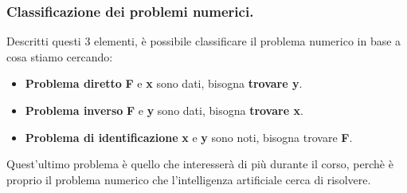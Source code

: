 \subsubsection{Classificazione dei problemi numerici.} Descritti questi 
%
3 elementi, è possibile classificare il problema numerico in base a 
%
cosa stiamo cercando:
\begin{itemize}
    \item \textbf{Problema diretto} \textbf{F} e \textbf{x} sono dati,
%
    bisogna \textbf{trovare y}.
    \item \textbf{Problema inverso} \textbf{F} e \textbf{y} sono dati,
%
    bisogna \textbf{trovare x}.
    \item \textbf{Problema di identificazione} \textbf{x} e \textbf{y} sono noti,
%
    bisogna trovare \textbf{F}.
\end{itemize}
Quest’ultimo problema è quello che interesserà di più durante il corso, 
%
perchè è proprio il problema numerico che l’intelligenza artificiale
%
cerca di risolvere.

\newpage
